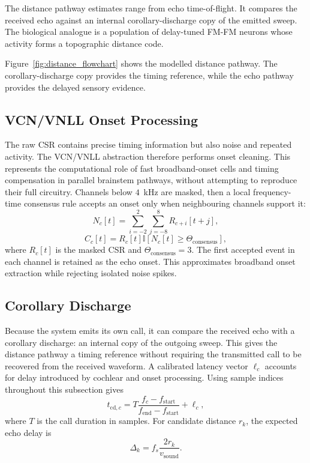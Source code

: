 The distance pathway estimates range from echo time-of-flight. It compares the received echo against an internal corollary-discharge copy of the emitted sweep. The biological analogue is a population of delay-tuned FM-FM neurons whose activity forms a topographic distance code.



Figure~\ref{fig:distance_flowchart} shows the modelled distance pathway. The corollary-discharge copy provides the timing reference, while the echo pathway provides the delayed sensory evidence.

\subsection{VCN/VNLL Onset Processing}

The raw CSR contains precise timing information but also noise and repeated activity. The VCN/VNLL abstraction therefore performs onset cleaning. This represents the computational role of fast broadband-onset cells and timing compensation in parallel brainstem pathways, without attempting to reproduce their full circuitry. Channels below $4$~kHz are masked, then a local frequency-time consensus rule accepts an onset only when neighbouring channels support it:
\begin{equation}
    N_c[t] = \sum_{i=-2}^{2}\sum_{j=-8}^{8} R_{c+i}[t+j],
\end{equation}
\begin{equation}
    C_c[t] = R_c[t]\mathbb{I}[N_c[t]\geq \Theta_{\mathrm{consensus}}],
\end{equation}
where $R_c[t]$ is the masked CSR and $\Theta_{\mathrm{consensus}}=3$. The first accepted event in each channel is retained as the echo onset. This approximates broadband onset extraction while rejecting isolated noise spikes.

\subsection{Corollary Discharge}

Because the system emits its own call, it can compare the received echo with a corollary discharge: an internal copy of the outgoing sweep. This gives the distance pathway a timing reference without requiring the transmitted call to be recovered from the received waveform. A calibrated latency vector $\ell_c$ accounts for delay introduced by cochlear and onset processing. Using sample indices throughout this subsection gives
\begin{equation}
    t_{\mathrm{cd},c}
    =
    T\frac{f_c-f_{\mathrm{start}}}{f_{\mathrm{end}}-f_{\mathrm{start}}}
    + \ell_c,
\end{equation}
where $T$ is the call duration in samples. For candidate distance $r_k$, the expected echo delay is
\begin{equation}
    \Delta_k = f_s\frac{2r_k}{v_{\mathrm{sound}}}.
\end{equation}

